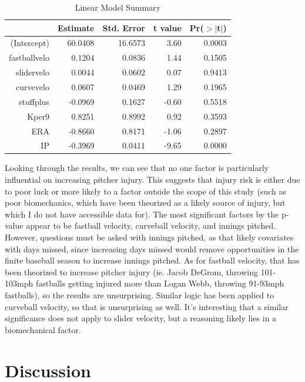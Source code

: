 \documentclass{article}
\begin{document}
\begin{table}[ht]
\centering
\begin{tabular}{rrrrr}
  \hline
 & Estimate & Std. Error & t value & Pr($>$$|$t$|$) \\ 
  \hline
(Intercept) & 60.0408 & 16.6573 & 3.60 & 0.0003 \\ 
  fastballvelo & 0.1204 & 0.0836 & 1.44 & 0.1505 \\ 
  slidervelo & 0.0044 & 0.0602 & 0.07 & 0.9413 \\ 
  curvevelo & 0.0607 & 0.0469 & 1.29 & 0.1965 \\ 
  stuffplus & -0.0969 & 0.1627 & -0.60 & 0.5518 \\ 
  Kper9 & 0.8251 & 0.8992 & 0.92 & 0.3593 \\ 
  ERA & -0.8660 & 0.8171 & -1.06 & 0.2897 \\ 
  IP & -0.3969 & 0.0411 & -9.65 & 0.0000 \\ 
   \hline
\end{tabular}
\caption{Linear Model Summary} 
\label{tab:lm_summary}
\end{table}

Looking through the results, we can see that no one factor is particularly influential on increasing pitcher injury. This suggests that injury risk is either due to poor luck or more likely to a factor outside the scope of this study (such as poor biomechanics, which have been theorized as a likely source of injury, but which I do not have accessible data for). The most significant factors by the p-value appear to be fastball velocity, curveball velocity, and innings pitched. However, questions must be asked with innings pitched, as that likely covariates with days missed, since increasing days missed would remove opportunities in the finite baseball season to increase innings pitched. As for fastball velocity, that has been theorized to increase pitcher injury (ie. Jacob DeGrom, throwing 101-103mph fastballs getting injured more than Logan Webb, throwing 91-93mph fastballs), so the results are unsurprising. Similar logic has been applied to curveball velocity, so that is unsurprising as well. It's interesting that a similar significance does not apply to slider velocity, but a reasoning likely lies in a biomechanical factor.

\section{Discussion}





\end{document}
